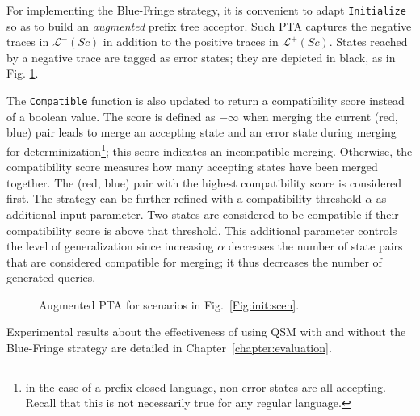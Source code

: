 For implementing the Blue-Fringe strategy, it is convenient to adapt \texttt{Initialize} so as to build an \emph{augmented} prefix tree acceptor. Such PTA captures the negative traces in $\mathcal{L}^-(Sc)$ in addition to the positive traces in $\mathcal{L}^+(Sc)$. States reached by a negative trace are tagged as error states; they are depicted in black, as in Fig. \ref{figure:augmented-pta}. 

The \texttt{Compatible} function is also updated to return a compatibility score instead of a boolean value. The score is defined as $-\infty$ when merging the current (red, blue) pair leads to merge an accepting state and an error state during merging for determinization\footnote{in the case of a prefix-closed language, non-error states are all accepting. Recall that this is not necessarily true for any regular language.}; this score indicates an incompatible merging. Otherwise, the compatibility score measures how many accepting states have been merged together. The (red, blue) pair with the highest compatibility score is considered first. The strategy can be further refined with a compatibility threshold $\alpha$ as additional input parameter. Two states are considered to be compatible if their compatibility score is above that threshold. This additional parameter controls the level of generalization since increasing $\alpha$ decreases the number of state pairs that are considered compatible for merging; it thus decreases the number of generated queries.

\begin{figure}\centering
{}
\caption{Augmented PTA for scenarios in Fig.~\ref{Fig:init:scen}\label{figure:augmented-pta}.}
\end{figure}

Experimental results about the effectiveness of using QSM with and without the Blue-Fringe strategy are detailed in Chapter~\ref{chapter:evaluation}.
